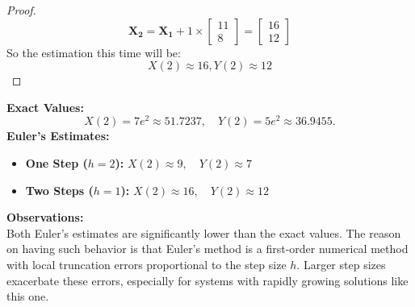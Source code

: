\documentclass{article}
\begin{document}
\begin{proof}
    \[ \mathbf{X_2} = \mathbf{X_1} + 1 \times \begin{bmatrix} 11 \\ 8 \end{bmatrix} = \begin{bmatrix} 16 \\ 12 \end{bmatrix} \]
    So the estimation this time will be:
    \[ X(2) \approx 16, Y(2) \approx 12 \]
\end{proof}

\noindent \textbf{Exact Values:}
\[
    X(2) = 7e^2 \approx 51.7237, \quad Y(2) = 5e^2 \approx 36.9455.
\]
\textbf{Euler's Estimates:}
\begin{itemize}
    \item \textbf{One Step (\( h = 2 \)):} \( X(2) \approx 9, \quad Y(2) \approx 7 \)
    \item \textbf{Two Steps (\( h = 1 \)):} \( X(2) \approx 16, \quad Y(2) \approx 12 \)
\end{itemize}

\noindent \textbf{Observations:}
\\
Both Euler's estimates are significantly lower than the exact values. The reason on having such behavior is that
Euler's method is a first-order numerical method with local truncation errors proportional to the step size \( h \). 
Larger step sizes exacerbate these errors, especially for systems with rapidly growing solutions like this one.
\end{document}
